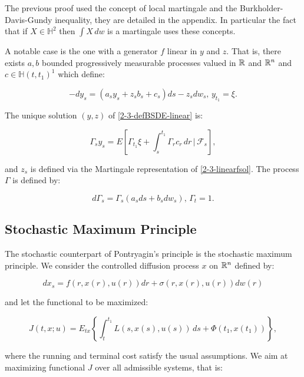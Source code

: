 The previous proof used the concept of local martingale and the Burkholder-Davis-Gundy inequality, they are detailed in the appendix. In particular the fact that if $X\in\mathbb{H}^2$ then $\int X\,dw$ is a martingale uses these concepts.

A notable case is the one with a generator $f$ linear in $y$ and $z$. That is, there exists 
$a,b$ bounded progressively measurable processes valued in $\mathbb{R}$ and $\mathbb{R}^n$ and $c\in\mathbb{H}(t,t_1)^1$ which define:

\begin{equation}\label{2-3-defBSDE-linear}-dy_s = \left(a_sy_s + z_sb_s + c_s\right)ds - z_sdw_s,\,y_{t_1}=\xi.\end{equation}

\begin{proposition}
    The unique solution $(y,z)$ of \ref{2-3-defBSDE-linear} is:
    
    \begin{equation}\label{2-3-linearfsol}
        \Gamma_sy_s = E\left[\Gamma_{t_1}\xi + \int_s^{t_1} \Gamma_rc_r\,dr\,|\,\mathcal{F}_s\right],
    \end{equation}

    and $z_s$ is defined via the Martingale representation of \ref{2-3-linearfsol}. The process $\Gamma$ is defined by:

    \[d\Gamma_s = \Gamma_s\left(a_sds + b_sdw_s\right),\,\Gamma_t=1.\]
\end{proposition}

\subsection{Stochastic Maximum Principle}

The stochastic counterpart of Pontryagin's principle is the stochastic maximum principle. We consider the controlled diffusion process $x$ on $\mathbb{R}^n$ defined by:

\begin{equation}
    dx_s = f(r,x(r),u(r))dr + \sigma(r,x(r),u(r))dw(r)
\end{equation}

and let the functional to be maximized:

\begin{equation}\label{2-3-newfunctmax}
    J(t,x;u) = E_{tx}\left\{\int_t^{t_1}L(s,x(s),u(s))\,ds + \Phi(t_1,x(t_1))\right\},
\end{equation}

where the running and terminal cost satisfy the usual assumptions. We aim at maximizing functional $J$ over all 
admissible systems, that is:

